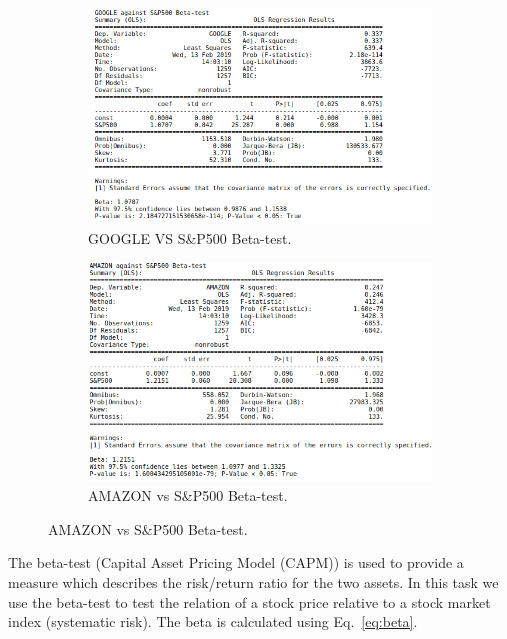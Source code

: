 \begin{figure}[H]
     \centering
     \begin{subfigure}[b]{0.8\textwidth}
         \centering
         \includegraphics[width=\textwidth]{imgs/beta_1.png}
         \caption{GOOGLE VS S\&P500 Beta-test.}
         \label{fig:beta_1}
     \end{subfigure}
     \hfill
     \begin{subfigure}[b]{0.8\textwidth}
         \centering
         \includegraphics[width=\textwidth]{imgs/beta_2.png}
         \caption{AMAZON vs S\&P500 Beta-test.}
         \label{fig:beta_2}
     \end{subfigure}
\end{figure}

\noindent
The beta-test (Capital Asset Pricing Model (CAPM)) is used to provide a measure which describes the risk/return ratio for the two assets. In this task we use the beta-test to test the relation of a stock price relative to a stock market index (systematic risk). The beta is calculated using Eq.~\ref{eq:beta}. 

